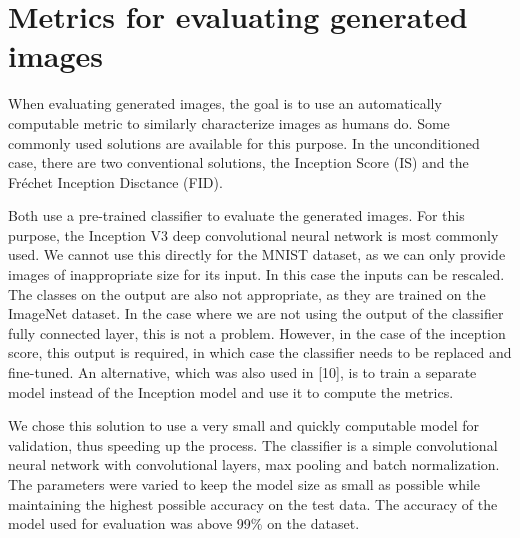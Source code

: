 \documentclass[lettersize,journal]{IEEEtran}
\begin{document}
\section{Metrics for evaluating generated images}
When evaluating generated images, the goal is to use an automatically computable metric to similarly characterize images as humans do. Some commonly used solutions are available for this purpose. In the unconditioned case, there are two conventional solutions, the Inception Score (IS) and the Fréchet Inception Disctance (FID).

Both use a pre-trained classifier to evaluate the generated images. For this purpose, the Inception V3 deep convolutional neural network is most commonly used. We cannot use this directly for the MNIST dataset, as we can only provide images of inappropriate size for its input. In this case the inputs can be rescaled. The classes on the output are also not appropriate, as they are trained on the ImageNet dataset. In the case where we are not using the output of the classifier fully connected layer, this is not a problem. However, in the case of the inception score, this output is required, in which case the classifier needs to be replaced and fine-tuned. An alternative, which was also used in [10], is to train a separate model instead of the Inception model and use it to compute the metrics.

\vspace*{1em}We chose this solution to use a very small and quickly computable model for validation, thus speeding up the process. The classifier is a simple convolutional neural network with convolutional layers, max pooling and batch normalization. The parameters were varied to keep the model size as small as possible while maintaining the highest possible accuracy on the test data. The accuracy of the model used for evaluation was above 99\%  on the dataset.
\end{document}
